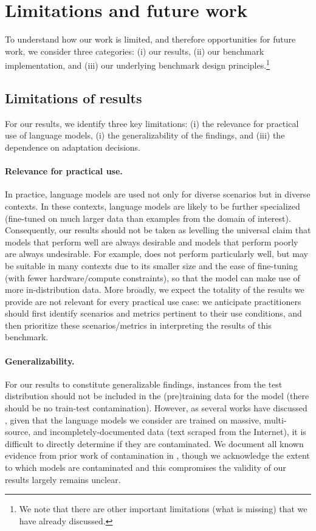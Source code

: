\hypertarget{limitations}{\section{Limitations and future work}}
\label{sec:limitations}
To understand how our work is limited, and therefore opportunities for future work, we consider three categories: 
(i) our results,
(ii) our benchmark implementation,
and (iii) our underlying benchmark design principles.\footnote{We note that there are other important limitations (\eg what is missing) that we have already discussed.}

\subsection{Limitations of results}
For our results, we identify three key limitations: 
(i) the relevance for practical use of language models, 
(i) the generalizability of the findings, and 
(iii) the dependence on adaptation decisions. 

\paragraph{Relevance for practical use.}
In practice, language models are used not only for diverse scenarios but in diverse contexts.
In these contexts, language models are likely to be further specialized (\eg fine-tuned on much larger data than \numincontext examples from the domain of interest).
Consequently, our results should not be taken as levelling the universal claim that models that perform well are always desirable and models that perform poorly are always undesirable.
For example, \gptj does not perform particularly well, but may be suitable in many contexts due to its smaller size and the ease of fine-tuning (\eg with fewer hardware/compute constraints), so that the model can make use of more in-distribution data. 
More broadly, we expect the totality of the results we provide are not relevant for every practical use case: we anticipate practitioners should first identify scenarios and metrics pertinent to their use conditions, and then prioritize these scenarios/metrics in interpreting the results of this benchmark.

\paragraph{Generalizability.}
For our results to constitute generalizable findings, instances from the test distribution should not be included in the (pre)training data for the model (\ie there should be no train-test contamination). 
However, as several works have discussed \citep[\eg][]{brown2020gpt3, dodge2021c4, sanh2021multitask}, given that the language models we consider are trained on massive, multi-source, and incompletely-documented data (\eg text scraped from the Internet), it is difficult to directly determine if they are contaminated.
We document all known evidence from prior work of contamination in , though we acknowledge the extent to which models are contaminated and this compromises the validity of our results largely remains unclear. 

